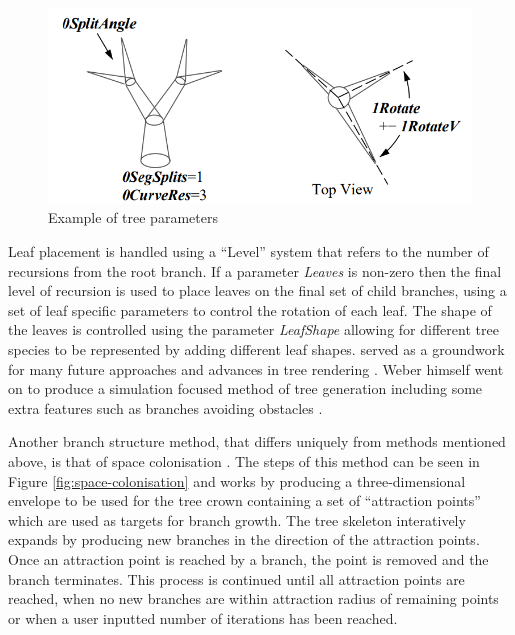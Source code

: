 \documentclass[final]{cmpreport}
\begin{document}
\begin{figure}[ht]
    \includegraphics[scale=0.5]{weber-splits.PNG} 
    \centering
    \captionsetup{justification=centering}
    \caption{Example of tree parameters}
    \label{fig:weber-splits}
\end{figure}

Leaf placement is handled using a ``Level'' system that refers to the number of recursions from 
the root branch. If a parameter \emph{Leaves} is non-zero then the final level of recursion is 
used to place leaves on the final set of child branches, using a set of leaf specific parameters 
to control the rotation of each leaf. The shape of the leaves is controlled using the parameter 
\emph{LeafShape} allowing for different tree species to be represented by adding different leaf 
shapes.
\cite{weber1995rendering} served as a groundwork for many future approaches and advances in tree 
rendering \citep{remolar2004rendering,wesslen2005real}. Weber himself went on to produce a 
simulation focused method of tree generation including some extra features such as branches 
avoiding obstacles \citep{weber2008simulation}.

Another branch structure method, that differs uniquely from methods mentioned above, is that of 
space colonisation \citep{runions2007colonization}. The steps of this method can be seen in Figure \ref{fig:space-colonisation} 
and works by producing a three-dimensional envelope to be used for the tree crown containing a set 
of ``attraction points'' which are used as targets for branch growth. The tree skeleton interatively 
expands by producing new branches in the direction of the attraction points. Once an attraction point 
is reached by a branch, the point is removed and the branch terminates. This process is continued 
until all attraction points are reached, when no new branches are within attraction radius of 
remaining points or when a user inputted number of iterations has been reached. 
\end{document}
